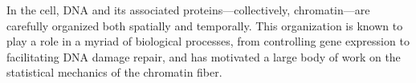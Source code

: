 \documentclass[%
 reprint,
superscriptaddress,
showpacs,preprintnumbers,
 amsmath,amssymb,
 aps,
 prl,
]{revtex4-1}
\begin{document}


In the cell, DNA and its associated proteins---collectively, chromatin---are
    carefully organized both spatially and temporally.
This organization is known to play a role in a myriad of biological processes,
    from controlling gene expression to facilitating DNA damage repair, and has
    motivated a large body of work on the statistical mechanics of the chromatin
    fiber.
\end{document}
